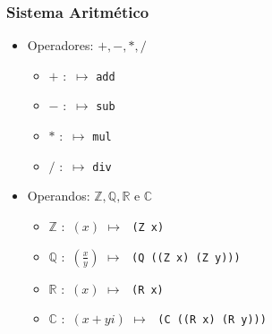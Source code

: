 \begin{frame}
  \frametitle{Sistema Aritmético}
    \begin{itemize}
      \item Operadores: $+, -, *, /$ \\
      \vspace{0.5em}
      \begin{itemize}
        \item $+ \,\,:\,\, \mapsto \,\,$\texttt{add}
        \item $- \,\,:\,\, \mapsto \,\,$\texttt{sub}
        \item $* \,\,:\,\, \mapsto \,\,$\texttt{mul}
        \item $/ \,\,:\,\, \mapsto \,\,$\texttt{div}
      \end{itemize}
      \pause

      \vspace{1.3em}
      \item Operandos: $\mathbb{Z}, \mathbb{Q}, \mathbb{R}\text{ e }\mathbb{C}$
      \vspace{0.5em}
      \begin{itemize}
        \item $\mathbb{Z}\,\,:\,\,(x)\,\,\mapsto\,\,$ \texttt{(Z x)} \\
        \vspace{0.5em}
        \item $\mathbb{Q}\,\,:\,\,(\frac{x}{y})\,\,\mapsto\,\,$ \texttt{(Q ((Z x) (Z y)))} \\
        \vspace{0.5em}
        \item $\mathbb{R}\,\,:\,\,(x) \,\,\mapsto\,\,$ \texttt{(R x)} \\
        \vspace{0.5em}
        \item $\mathbb{C}\,\,:\,\,(x + yi) \,\,\mapsto\,\,$ \texttt{(C ((R x) (R y)))} \\
      \end{itemize}
    \end{itemize}
\end{frame}



